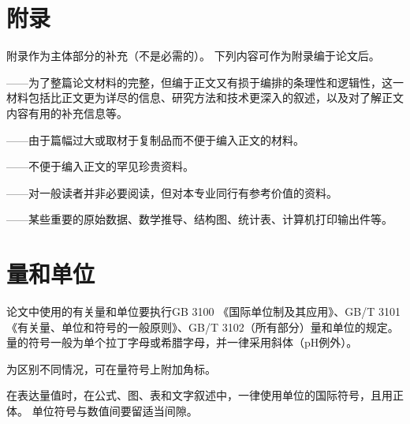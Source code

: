 \section{附录}

附录作为主体部分的补充（不是必需的）。
下列内容可作为附录编于论文后。

——为了整篇论文材料的完整，但编于正文又有损于编排的条理性和逻辑性，这一材料包括比正文更为详尽的信息、研究方法和技术更深入的叙述，以及对了解正文内容有用的补充信息等。

——由于篇幅过大或取材于复制品而不便于编入正文的材料。

——不便于编入正文的罕见珍贵资料。

——对一般读者并非必要阅读，但对本专业同行有参考价值的资料。

——某些重要的原始数据、数学推导、结构图、统计表、计算机打印输出件等。

\section{量和单位}

论文中使用的有关量和单位要执行GB 3100 《国际单位制及其应用》、GB/T 3101《有关量、单位和符号的一般原则》、GB/T 3102（所有部分）量和单位的规定。
量的符号一般为单个拉丁字母或希腊字母，并一律采用斜体（pH例外）。

为区别不同情况，可在量符号上附加角标。

在表达量值时，在公式、图、表和文字叙述中，一律使用单位的国际符号，且用正体。
单位符号与数值间要留适当间隙。
